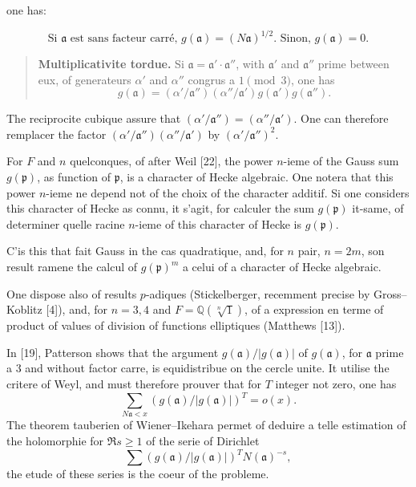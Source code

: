 \documentclass[12pt,a4paper]{article}
\theoremstyle{plain}
\theoremstyle{definition}
\theoremstyle{remark}
\newcommand{\QQ}{\mathbb{Q}}
\newcommand{\frakp}{\mathfrak{p}}
\newcommand{\fraka}{\mathfrak{a}}
\providecommand{\QQ}{\mathbb{Q}}
\providecommand{\fraka}{\mathfrak{a}}
\providecommand{\frakp}{\mathfrak{p}}
\begin{document}
one has:

\begin{equation}\label{eq:0.3}
\text{Si $\fraka$ est sans facteur carré, } g(\fraka) = (N\fraka)^{1/2}. \text{ Sinon, } g(\fraka) = 0.
\tag{0.3}
\end{equation}

\begin{quote}
\textbf{Multiplicativite tordue.} Si $\fraka = \fraka' \cdot \fraka''$, with $\fraka'$ and $\fraka''$ prime between eux, of generateurs $\alpha'$ and $\alpha''$ congrus a $1 \pmod 3$, one has
\[
g(\fraka) = (\alpha'/\fraka'')(\alpha''/\fraka') g(\fraka') g(\fraka'').
\]
\end{quote}

The reciprocite cubique assure that $(\alpha'/\fraka'') = (\alpha''/\fraka')$. One can therefore remplacer the factor $(\alpha'/\fraka'')(\alpha''/\fraka')$ by $(\alpha'/\fraka'')^2$.

For $F$ and $n$ quelconques, of after Weil [22], the power $n$-ieme of the Gauss sum $g(\frakp)$, as function of $\frakp$, is a character of Hecke algebraic. One notera that this power $n$-ieme ne depend not of the choix of the character additif. Si one considers this character of Hecke as connu, it s'agit, for calculer the sum $g(\frakp)$ it-same, of determiner quelle racine $n$-ieme of this character of Hecke is $g(\frakp)$.

C'is this that fait Gauss in the cas quadratique, and, for $n$ pair, $n = 2m$, son result ramene the calcul of $g(\frakp)^m$ a celui of a character of Hecke algebraic.

One dispose also of results $p$-adiques (Stickelberger, recemment precise by Gross--Koblitz [4]), and, for $n = 3, 4$ and $F = \QQ(\sqrt[n]{1})$, of a expression en terme of product of values of division of functions elliptiques (Matthews [13]).

In [19], Patterson shows that the argument $g(\fraka)/|g(\fraka)|$ of $g(\fraka)$, for $\fraka$ prime a $3$ and without factor carre, is equidistribue on the cercle unite. It utilise the critere of Weyl, and must therefore prouver that for $T$ integer not zero, one has
\begin{equation}\label{eq:0.5}
\sum_{N\fraka < x} (g(\fraka)/|g(\fraka)|)^T = o(x).
\tag{0.5}
\end{equation}
The theorem tauberien of Wiener--Ikehara permet of deduire a telle estimation of the holomorphie for $\Re s \geq 1$ of the serie of Dirichlet
\begin{equation}\label{eq:0.6}
\sum (g(\fraka)/|g(\fraka)|)^T N(\fraka)^{-s},
\tag{0.6}
\end{equation}
the etude of these series is the coeur of the probleme.
\end{document}
